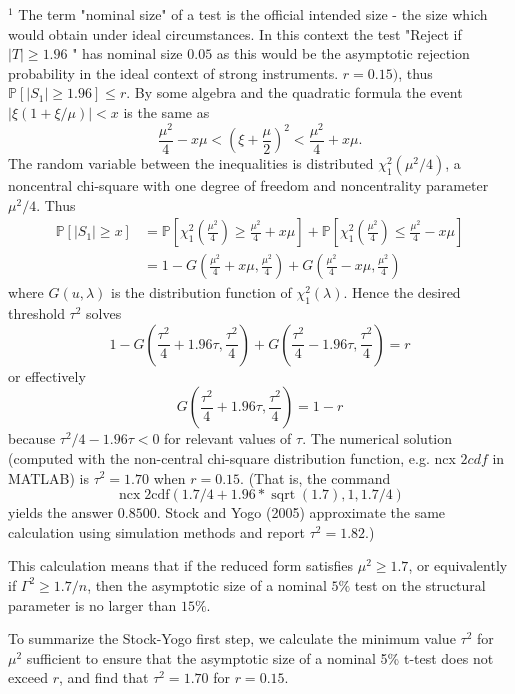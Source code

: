 \documentclass[10pt]{article}
\begin{document}
${ }^{1}$ The term "nominal size" of a test is the official intended size - the size which would obtain under ideal circumstances. In this context the test "Reject if $|T| \geq 1.96$ " has nominal size $0.05$ as this would be the asymptotic rejection probability in the ideal context of strong instruments. $r=0.15)$, thus $\mathbb{P}\left[\left|S_{1}\right| \geq 1.96\right] \leq r$. By some algebra and the quadratic formula the event $|\xi(1+\xi / \mu)|<x$ is the same as
$$
\frac{\mu^{2}}{4}-x \mu<\left(\xi+\frac{\mu}{2}\right)^{2}<\frac{\mu^{2}}{4}+x \mu .
$$
The random variable between the inequalities is distributed $\chi_{1}^{2}\left(\mu^{2} / 4\right)$, a noncentral chi-square with one degree of freedom and noncentrality parameter $\mu^{2} / 4$. Thus
$$
\begin{aligned}
\mathbb{P}\left[\left|S_{1}\right| \geq x\right] &=\mathbb{P}\left[\chi_{1}^{2}\left(\frac{\mu^{2}}{4}\right) \geq \frac{\mu^{2}}{4}+x \mu\right]+\mathbb{P}\left[\chi_{1}^{2}\left(\frac{\mu^{2}}{4}\right) \leq \frac{\mu^{2}}{4}-x \mu\right] \\
&=1-G\left(\frac{\mu^{2}}{4}+x \mu, \frac{\mu^{2}}{4}\right)+G\left(\frac{\mu^{2}}{4}-x \mu, \frac{\mu^{2}}{4}\right)
\end{aligned}
$$
where $G(u, \lambda)$ is the distribution function of $\chi_{1}^{2}(\lambda)$. Hence the desired threshold $\tau^{2}$ solves
$$
1-G\left(\frac{\tau^{2}}{4}+1.96 \tau, \frac{\tau^{2}}{4}\right)+G\left(\frac{\tau^{2}}{4}-1.96 \tau, \frac{\tau^{2}}{4}\right)=r
$$
or effectively
$$
G\left(\frac{\tau^{2}}{4}+1.96 \tau, \frac{\tau^{2}}{4}\right)=1-r
$$
because $\tau^{2} / 4-1.96 \tau<0$ for relevant values of $\tau$. The numerical solution (computed with the non-central chi-square distribution function, e.g. ncx $2 c d f$ in MATLAB) is $\tau^{2}=1.70$ when $r=0.15$. (That is, the command
$$
\operatorname{ncx} 2 \mathrm{cdf}(1.7 / 4+1.96 * \operatorname{sqrt}(1.7), 1,1.7 / 4)
$$
yields the answer $0.8500$. Stock and Yogo (2005) approximate the same calculation using simulation methods and report $\tau^{2}=1.82$.)

This calculation means that if the reduced form satisfies $\mu^{2} \geq 1.7$, or equivalently if $\Gamma^{2} \geq 1.7 / n$, then the asymptotic size of a nominal $5 \%$ test on the structural parameter is no larger than $15 \%$.

To summarize the Stock-Yogo first step, we calculate the minimum value $\tau^{2}$ for $\mu^{2}$ sufficient to ensure that the asymptotic size of a nominal 5\% t-test does not exceed $r$, and find that $\tau^{2}=1.70$ for $r=0.15$.
\end{document}

